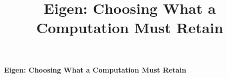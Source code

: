 \documentclass[11pt,a4paper]{article}
\title{Eigen: Choosing What a Computation Must Retain}
\author{}
\date{}
\begin{document}
\begin{center}
{\Large\bfseries Eigen: Choosing What a Computation Must Retain\par}

\end{center}
\vspace{0.4em}










\begingroup
\small


\endgroup
\end{document}
